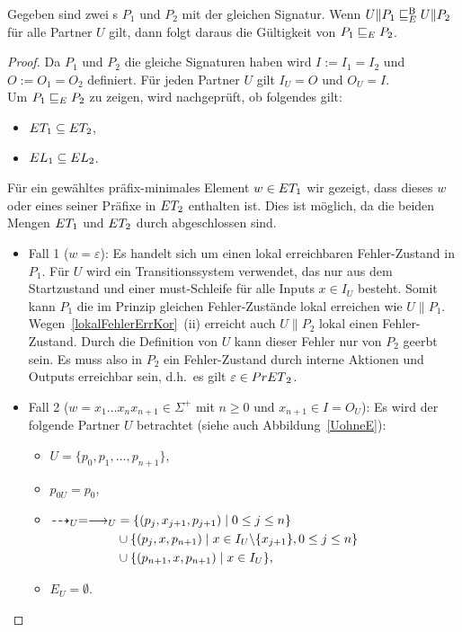 \begin{Lem}
  \label{KommVerfeinLem}
  Gegeben sind zwei \MEIO{}s $P_1$ und $P_2$ mit der gleichen Signatur. Wenn
  $U\|P_1\EBRel{} U\|P_2$ für alle Partner $U$ gilt, dann folgt daraus die
  Gültigkeit von $P_1\ERel{} P_2$.
\end{Lem}
\begin{proof}
  Da $P_1$ und $P_2$ die gleiche Signaturen haben wird $I:=I_1=I_2$ und
  $O:=O_1=O_2$ definiert. Für jeden Partner $U$ gilt $I_U=O$ und $O_U=I$.\\
  Um $P_1\ERel{}P_2$ zu zeigen, wird nachgeprüft, ob folgendes gilt:
  \begin{itemize}
    \item $\ET _1\subseteq \ET _2$,
    \item $\EL _1\subseteq \EL _2$.
  \end{itemize}
  Für ein gewähltes präfix-minimales Element $w\in\ET _1$ wir gezeigt, dass
  dieses $w$ oder eines seiner Präfixe in $\ET _2$ enthalten ist. Dies ist
  möglich, da die beiden Mengen $\ET _1$ und $\ET _2$ durch \cont{}
  abgeschlossen sind.
  \begin{itemize}
    \item Fall 1 ($w=\varepsilon$): Es handelt sich um einen lokal erreichbaren
      Fehler-Zustand in $P_1$. Für $U$ wird ein Transitionssystem verwendet,
      das nur aus dem Startzustand und einer must-Schleife für alle Inputs
      $x\in I_U$ besteht. Somit kann $P_1$ die im Prinzip gleichen
      Fehler-Zustände lokal erreichen wie $U\|P_1$.
      Wegen~\ref{lokalFehlerErrKor}~(ii) erreicht auch $U\|P_2$ lokal einen
      Fehler-Zustand. Durch die Definition von $U$ kann dieser Fehler nur von
      $P_2$ geerbt sein. Es muss also in $P_2$ ein Fehler-Zustand durch interne
      Aktionen und Outputs erreichbar sein, d.h.\ es gilt $\varepsilon\in
      \PrET{}_2$.
    \item Fall 2 ($w=x_1\dots x_n x_{n+1}\in\Sigma ^+$ mit $n\geq 0$ und
      $x_{n+1}\in I = O_U$): Es wird der folgende Partner $U$ betrachtet (siehe
      auch Abbildung~\ref{UohneE}):
      \begin{itemize}
        \item $U=\{p_0,p_1,\dots ,p_{n+1}\}$,
        \item $p_{0U}=p_0$,
        \item $\begin{aligned}[t]
            \may _U = \must _U&=\{(p_j,x_{j+1},p_{j+1})\mid  0\leq j\leq n\}\\
            &\cup\{(p_j,x,p_{n+1})\mid  x\in I_U\backslash\{x_{j+1}\}, 0\leq
            j\leq n\}\\
            &\cup\{(p_{n+1},x,p_{n+1})\mid  x\in I_U\},
        \end{aligned}$
        \item $E_U=\emptyset$.
      \end{itemize}
      \begin{figure} [h!tbp]
      \begin{center}
        \begin{tikzpicture}[->, >=latex',auto,node distance =3cm, semithick]


\end{tikzpicture}
\end{center}
\end{figure}
\end{itemize}
\end{proof}
